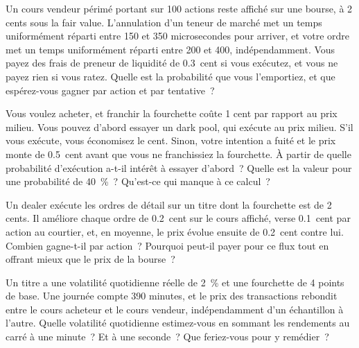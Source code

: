 \begin{question}\label{iq:iv2:markets-and-microstructure:26}
Un cours vendeur périmé portant sur 100 actions reste affiché sur une bourse, à 2 cents sous la fair value. L'annulation d'un teneur de marché met un temps uniformément réparti entre 150 et 350 microsecondes pour arriver, et votre ordre met un temps uniformément réparti entre 200 et 400, indépendamment. Vous payez des frais de preneur de liquidité de 0.3~cent si vous exécutez, et vous ne payez rien si vous ratez. Quelle est la probabilité que vous l'emportiez, et que espérez-vous gagner par action et par tentative~?
\end{question}

\begin{question}\label{iq:iv2:markets-and-microstructure:27}
Vous voulez acheter, et franchir la fourchette coûte 1 cent par rapport au prix milieu. Vous pouvez d'abord essayer un dark pool, qui exécute au prix milieu. S'il vous exécute, vous économisez le cent. Sinon, votre intention a fuité et le prix monte de 0.5~cent avant que vous ne franchissiez la fourchette. À partir de quelle probabilité d'exécution a-t-il intérêt à essayer d'abord~? Quelle est la valeur pour une probabilité de 40~\%~? Qu'est-ce qui manque à ce calcul~?
\end{question}

\begin{question}\label{iq:iv2:markets-and-microstructure:28}
Un dealer exécute les ordres de détail sur un titre dont la fourchette est de 2 cents. Il améliore chaque ordre de 0.2~cent sur le cours affiché, verse 0.1~cent par action au courtier, et, en moyenne, le prix évolue ensuite de 0.2~cent contre lui. Combien gagne-t-il par action~? Pourquoi peut-il payer pour ce flux tout en offrant mieux que le prix de la bourse~?
\end{question}

\begin{question}\label{iq:iv2:markets-and-microstructure:29}
Un titre a une volatilité quotidienne réelle de 2~\% et une fourchette de 4 points de base. Une journée compte 390 minutes, et le prix des transactions rebondit entre le cours acheteur et le cours vendeur, indépendamment d'un échantillon à l'autre. Quelle volatilité quotidienne estimez-vous en sommant les rendements au carré à une minute~? Et à une seconde~? Que feriez-vous pour y remédier~?
\end{question}

